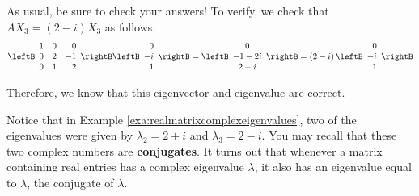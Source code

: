 \begin{solution}
As usual, be sure to check your answers! To verify, we check that 
$AX_3 = \left(2 - i \right) X_3$ as follows.
\begin{equation*}
\leftB
\begin{array}{rrr}
1 & 0 &  0 \\
0 & 2 & -1 \\
0 & 1 &  2
\end{array}
\rightB \leftB
\begin{array}{r}
0 \\
-i \\
1
\end{array}
\rightB = \leftB
\begin{array}{c}
0 \\
-1-2i \\
2-i
\end{array}
\rightB =\left( 2-i\right) \leftB
\begin{array}{r}
0 \\
-i \\
1
\end{array}
\rightB
\end{equation*}

Therefore, we know that this eigenvector and eigenvalue are correct. 
\end{solution}

Notice that in Example \ref{exa:realmatrixcomplexeigenvalues}, two of the eigenvalues were given by 
$\lambda_2 = 2 + i$ and $\lambda_3 = 2-i$. You may recall that these two complex numbers are \textbf{conjugates}. 
It turns out that whenever a matrix containing real entries has a complex eigenvalue $\lambda$, it also has an eigenvalue
equal to $\overline{\lambda}$, the conjugate of $\lambda$. 
